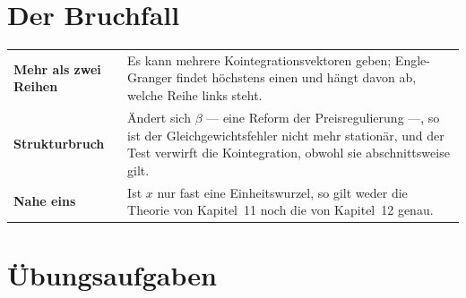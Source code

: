 \section{Der Bruchfall}

\begin{warnung}
\begin{center}
{\small
\renewcommand{\arraystretch}{1.52}
\begin{tabular}{@{}P{2.8cm}P{5.8cm}@{}}
\toprule
\textbf{Mehr als zwei Reihen} & Es kann mehrere Kointegrationsvektoren geben; Engle-Granger findet höchstens einen und hängt davon ab, welche Reihe links steht.\\
\textbf{Strukturbruch} & Ändert sich $\beta$ --- eine Reform der Preisregulierung ---, so ist der Gleichgewichtsfehler nicht mehr stationär, und der Test verwirft die Kointegration, obwohl sie abschnittsweise gilt.\\
\textbf{Nahe eins} & Ist $x$ nur fast eine Einheitswurzel, so gilt weder die Theorie von Kapitel~11 noch die von Kapitel~12 genau.\\
\bottomrule
\end{tabular}}
\end{center}

\begin{center}
\begin{minipage}{0.88\textwidth}
\end{minipage}
\end{center}
\end{warnung}

\section{Übungsaufgaben}

